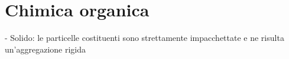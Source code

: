 \section{Chimica organica}
- Solido: le particelle costituenti sono strettamente impacchettate e ne risulta un'aggregazione rigida
